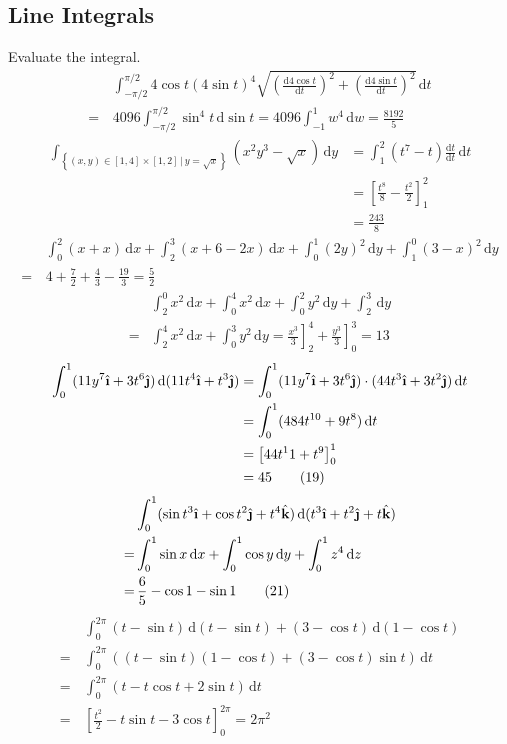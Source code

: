 \documentclass[a4paper,12pt]{article}
\newcommand{\ud}{\,\mathrm{d}}
\newcommand{\unit}[1]{\hat{\textbf #1}}
\newcommand{\leibniz}[3][]{\frac{\mathrm{d} #1 #2}{\mathrm{d} #3 #1}}
\begin{document}
\subsection{Line Integrals}
Evaluate the integral.
\begin{align*}
&\int_{-\pi/2}^{\pi/2}4\cos t(4\sin t)^4
 \sqrt{\left(\leibniz{4\cos t}{t}\right)^2
     + \left(\leibniz{4\sin t}{t}\right)^2}\ud t\\
=\,&4096\int_{-\pi/2}^{\pi/2}\sin^4 t\ud\sin t
= 4096\int_{-1}^1 w^4\ud w
= \frac{8192}{5}\tag{3}
\end{align*}
\begin{align*}
  \int_{\left\{(x, y)\in[1,4]\times[1,2]\,|\,y=\sqrt x\right\}}
  \left(x^2 y^3 - \sqrt x\right)\ud y
  &= \int_1^2(t^7 - t)\leibniz{t}{t}\ud t\\
  &= \left[\frac{t^8}{8} - \frac{t^2}{2}\right]_1^2\\
  &= \frac{243}{8}\tag{5}
\end{align*}
\begin{align*}
& \int_0^2(x + x)\ud x + \int_2^3(x + 6 - 2x)\ud x
+ \int_0^1(2y)^2\ud y + \int_1^0(3-x)^2\ud y\\
=\,&4 + \frac72 + \frac43 - \frac{19}{3}
=\frac{5}{2}\tag{7}
\end{align*}
\begin{align*}
  &\int_2^0 x^2\ud x + \int_0^4 x^2\ud x + \int_0^2 y^2\ud y + \int_2^3\ud y\\
= &\int_2^4 x^2\ud x + \int_0^3 y^2\ud y
= \left.\frac{x^3}{3}\right]_2^4 + \left.\frac{y^3}{3}\right]_0^3
= 13\tag{8}
\end{align*}
\begin{align*}
   \int_0^1(11y^7\unit\i + 3t^6\unit\j)\ud(11t^4\unit\i + t^3\unit\j)
&= \int_0^1(11y^7\unit\i + 3t^6\unit\j)\cdot(44t^3\unit\i + 3t^2\unit\j)\ud t\\
  &= \int_0^1(484t^{10} + 9t^8)\ud t\\
&= \left[44t^11 + t^9\right]_0^1\\
&= 45\tag{19}
\end{align*}
\begin{align*}
 &\int_0^1(\sin t^3\unit\i + \cos t^2\unit\j + t^4\unit k)
  \ud(t^3\unit\i + t^2\unit\j + t\unit k)\\
=&\int_0^1\sin x\ud x + \int_0^1\cos y\ud y + \int_0^1 z^4\ud z\\
=&\,\frac{6}{5} - \cos 1 - \sin 1\tag{21}
\end{align*}
\begin{align*}
  &\int_0^{2\pi}(t - \sin t)\ud(t - \sin t) + (3 - \cos t)\ud(1 - \cos t)\\
= &\int_0^{2\pi}((t - \sin t)(1 - \cos t) + (3 - \cos t)\sin t)\ud t\\
= &\int_0^{2\pi}(t - t\cos t + 2\sin t)\ud t\\
=\,&\left[\frac{t^2}{2} - t\sin t - 3\cos t\right]_0^{2\pi}
= 2\pi^2\tag{39}
\end{align*}
\end{document}
